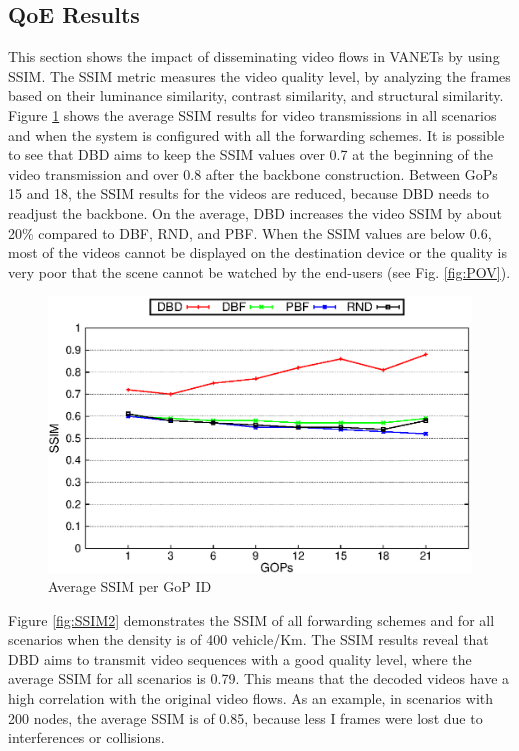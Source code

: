 \documentclass{acm_proc_article-sp}
\begin{document}
\subsection{QoE Results}
\label{QoEResults}
This section shows the impact of disseminating video flows in VANETs by using SSIM. The SSIM metric measures the video quality level, by analyzing the frames based on their luminance similarity, contrast similarity, and structural similarity.
Figure \ref{fig:SSIM} shows the average SSIM results for video transmissions in all scenarios and when the system is configured with all the forwarding schemes. It is possible to see that DBD aims to keep the SSIM values over 0.7 at the beginning of the video transmission and over 0.8 after the backbone construction. Between GoPs 15 and 18, the SSIM results for the videos are reduced, because DBD needs to readjust the backbone. On the average, DBD increases the video SSIM by about 20\% compared to DBF, RND, and PBF. When the SSIM values are below 0.6, most of the videos cannot be displayed on the destination device or the quality is very poor that the scene cannot be watched by the end-users (see Fig. \ref{fig:POV}).



\begin{figure}[tb]
\begin{center}
\includegraphics[width=.9\columnwidth]{./fig/selected/LineSSIMxGOPIDfinal.eps}
\caption{Average SSIM per GoP ID}
\label{fig:SSIM}
\end{center}
\end{figure}


Figure \ref{fig:SSIM2} demonstrates the SSIM of all forwarding schemes and for all scenarios when the density is of 400 vehicle/Km. The SSIM results reveal that DBD aims to transmit video sequences with a good quality level, where the average SSIM for all scenarios is 0.79. This means that the decoded videos have a high correlation with the original video flows. As an example, in scenarios with 200 nodes, the average SSIM is of 0.85, because less I frames were lost due to interferences or collisions.
\end{document}
